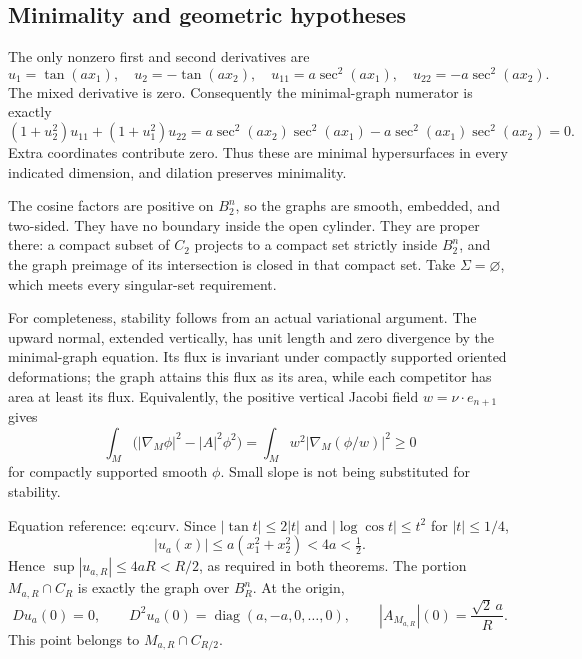 \documentclass[10pt]{article}
\begin{document}
\subsection*{Minimality and geometric hypotheses}
The only nonzero first and second derivatives are \[u_1=\tan(ax_1),\quad u_2=-\tan(ax_2),\quad
 u_{11}=a\sec^2(ax_1),\quad u_{22}=-a\sec^2(ax_2).\] The mixed derivative is zero. Consequently the minimal-graph numerator is exactly \[(1+u_2^2)u_{11}+(1+u_1^2)u_{22}
 =a\sec^2(ax_2)\sec^2(ax_1)
  -a\sec^2(ax_1)\sec^2(ax_2)=0.\] Extra coordinates contribute zero. Thus these are minimal hypersurfaces in every indicated dimension, and dilation preserves minimality.\par
The cosine factors are positive on \(B_2^n\), so the graphs are smooth, embedded, and two-sided. They have no boundary inside the open cylinder. They are proper there: a compact subset of \(C_2\) projects to a compact set strictly inside \(B_2^n\), and the graph preimage of its intersection is closed in that compact set. Take \(\Sigma=\varnothing\), which meets every singular-set requirement.\par
For completeness, stability follows from an actual variational argument. The upward normal, extended vertically, has unit length and zero divergence by the minimal-graph equation. Its flux is invariant under compactly supported oriented deformations; the graph attains this flux as its area, while each competitor has area at least its flux. Equivalently, the positive vertical Jacobi field \(w=\nu\cdot e_{n+1}\) gives \[\int_M\bigl(|\nabla_M\phi|^2-|A|^2\phi^2\bigr)
 =\int_M w^2\left|\nabla_M(\phi/w)\right|^2\ge0\] for compactly supported smooth \(\phi\). Small slope is not being substituted for stability.\par
Equation reference: eq:curv. Since \(|\tan t|\le2|t|\) and \(|\log\cos t|\le t^2\) for \(|t|\le1/4\), \[|u_a(x)|\le a(x_1^2+x_2^2)<4a<\tfrac12 .\] Hence \(\sup|u_{a,R}|\le4aR<R/2\), as required in both theorems. The portion \(M_{a,R}\cap C_R\) is exactly the graph over \(B_R^n\). At the origin, \[
 Du_a(0)=0,\qquad D^2u_a(0)=\operatorname{diag}(a,-a,0,\ldots,0),
 \qquad |A_{M_{a,R}}|(0)=\frac{\sqrt2\,a}{R}.\] This point belongs to \(M_{a,R}\cap C_{R/2}\).\par
\end{document}
